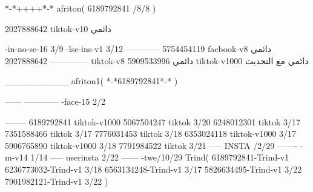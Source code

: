 *-*++++*-*
afriton(
6189792841 /8/8
)

2027888642 tiktok-v10
دائمي

-in-no-se-16 3/9
-lse-ins-v1 3/12
------------
5754454119 facbook-v8
دائمي
--------------
2027888642 tiktok-v8
دائمي
5909533996 tiktok-v1000
دائمي مع التحديث

__________
afriton1(
*-*6189792841*-*
)


------
------------
-face-15 2/2

--------
6189792841 tiktok-v1000
5067504247 tiktok 3/20
6248012301 tiktok 3/17
7351588466 tiktok 3/17
7776031453 tiktok 3/18
6353024118 tiktok-v1000 3/17
5906765890 tiktok-v1000 3/18
7791984522 tiktok 3/21
-----
 INSTA /2/29
-------
-m-v14 1/14
-----
userinsta 2/22
------
-twe/10/29
Trind(
6189792841-Trind-v1 
6236773032-Trind-v1 3/18
6563134248-Trind-v1 3/17
5826634495-Trind-v1 3/22
7901982121-Trind-v1 3/22
)
